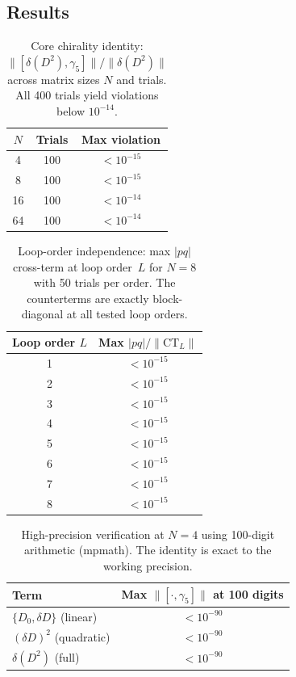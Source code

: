 \documentclass[12pt,a4paper]{article}
\theoremstyle{definition}
\theoremstyle{remark}
\begin{document}
\subsection{Results}

\begin{table}[ht]
\centering
\caption{Core chirality identity: $\|[\delta(D^2),\gamma_5]\|/\|\delta(D^2)\|$
across matrix sizes $N$ and trials.  All 400 trials yield violations below
$10^{-14}$.}\label{tab:chirality_core}
\begin{tabular}{@{}ccc@{}}
\toprule
$N$ & Trials & Max violation \\
\midrule
4  & 100 & $< 10^{-15}$ \\
8  & 100 & $< 10^{-15}$ \\
16 & 100 & $< 10^{-14}$ \\
64 & 100 & $< 10^{-14}$ \\
\bottomrule
\end{tabular}
\end{table}

\begin{table}[ht]
\centering
\caption{Loop-order independence: max $|pq|$ cross-term at loop order~$L$
for $N = 8$ with 50 trials per order.  The counterterms are exactly
block-diagonal at all tested loop orders.}\label{tab:loop_order}
\begin{tabular}{@{}cc@{}}
\toprule
Loop order $L$ & Max $|pq|/\|\mathrm{CT}_L\|$ \\
\midrule
1 & $< 10^{-15}$ \\
2 & $< 10^{-15}$ \\
3 & $< 10^{-15}$ \\
4 & $< 10^{-15}$ \\
5 & $< 10^{-15}$ \\
6 & $< 10^{-15}$ \\
7 & $< 10^{-15}$ \\
8 & $< 10^{-15}$ \\
\bottomrule
\end{tabular}
\end{table}

\begin{table}[ht]
\centering
\caption{High-precision verification at $N = 4$ using 100-digit arithmetic
(mpmath).  The identity is exact to the working precision.}\label{tab:mpmath}
\begin{tabular}{@{}lc@{}}
\toprule
Term & Max $\|[\cdot, \gamma_5]\|$ at 100 digits \\
\midrule
$\{D_0, \delta D\}$ (linear) & $< 10^{-90}$ \\
$(\delta D)^2$ (quadratic)   & $< 10^{-90}$ \\
$\delta(D^2)$ (full)         & $< 10^{-90}$ \\
\bottomrule
\end{tabular}
\end{table}
\end{document}
